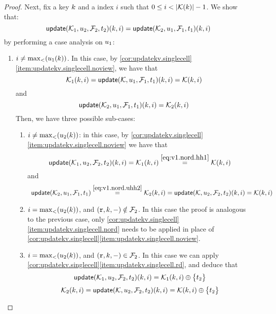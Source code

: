 \begin{proof}
Next, fix a key $k$ and a index $i$ such that $0 \leq i < \lvert  \mathcal{K}(k)  \rvert - 1$. 
We show that:
\[ 
    \updateKV(\hh_1,\vi_2,\fp_2,\txid_2)(\key, i) = \updateKV(\hh_2, \vi_1, \fp_1, \txid_1)(\key, i)
\]
by performing a case analysis on $u_1$: 
\begin{enumerate}
    \item $i \neq \max_{<}(u_1(k))$. 
In this case, by \cref{cor:updatekv.singlecell}\cref{item:updatekv.singlecell.noview}, 
we have that 
\begin{equation}
\hh_1(\key, i) = \updateKV(\mkvs, \vi_1, \fp_1, \txid_1)(\key, i) = \mkvs(\key, i)
\label{eq:v1.nord.hh1}
\end{equation}
and 
\begin{equation}
\updateKV(\hh_2, \vi_1, \fp_1, \txid_1)(\key, i) = \hh_2(\key, i)
\label{eq:v1.nord.uhh2}
\end{equation}
Then, we have three possible sub-cases: 
\begin{enumerate}
    \item $i \neq \max_{<}(u_2(k))$: in this case, by \cref{cor:updatekv.singlecell}\cref{item:updatekv.singlecell.noview} we have that 
\[\updateKV(\hh_1, \vi_2, \fp_2, \txid_2)(\key, i) = 
\hh_1(\key, i) \stackrel{\cref{eq:v1.nord.hh1}}{=} \mkvs(\key, i)
\]
and
\[
\begin{array}{l}
\updateKV(\hh_2, \vi_1, \fp_1, \txid_1) \stackrel{\cref{eq:v1.nord.uhh2}}{=} \hh_2(\key,i) = 
\updateKV(\mkvs, \vi_2, \fp_2, \txid_2)(\key, i) = \mkvs(\key, i)
\end{array}
\]
\item $i = \max_{<}(u_2(k))$, and $(\textnormal{\texttt r}, k, -) \notin \mathcal{F}_2$. In this case the proof is analogous to the previous case, 
only \cref{cor:updatekv.singlecell}\cref{item:updatekv.singlecell.nord} needs to be applied in place 
of \cref{cor:updatekv.singlecell}\cref{item:updatekv.singlecell.noview}.
\item $i = \max_{<}(u_2(k))$, and $(\textnormal{\texttt r}, k, -) \in \mathcal{F}_2$. In this case we can apply \cref{cor:updatekv.singlecell}\cref{item:updatekv.singlecell.rd}, 
and deduce that 
\begin{equation}
\updateKV(\hh_1, \vi_2, \fp_2, \txid_2)(\key, i) = \hh_1(\key, i) \oplus \Set{\txid_2}
\label{eq:v1.nord.v2.rd.uhh1}
\end{equation}
\begin{equation}
\hh_2(\key, i) = \updateKV(\mkvs, \vi_2, \fp_2, \txid_2)(\key, i) = \mkvs(\key,i) \oplus \Set{\txid_2}
\label{eq:v1.nord.v2.rd.hh2}
\end{equation}

\end{enumerate}
\end{enumerate}
\end{proof}
